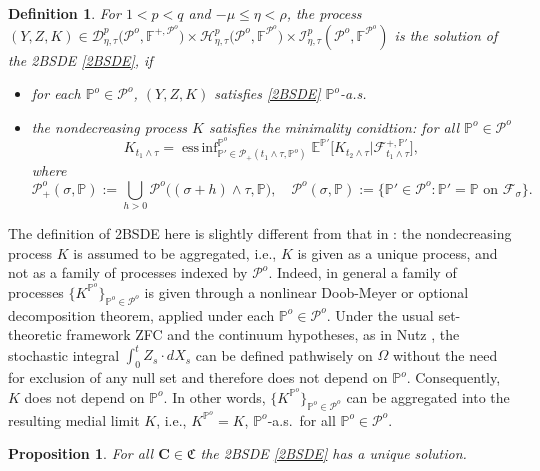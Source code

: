 \documentclass[11pt,a4paper]{article}
\numberwithin{equation}{section}
\def\dbF{\mathbb{F}}
\def\dbP{\mathbb{P}}
\newcommand{\cD}{\mathcal{D}}
\newcommand{\cF}{\mathcal{F}}
\newcommand{\cH}{\mathcal{H}}
\newcommand{\cI}{\mathcal{I}}
\newcommand{\cP}{\mathcal{P}}
\newcommand{\Cbf}{\mathbf{C}}
\newcommand{\frakC}{\mathfrak{C}}
\DeclareMathOperator*{\essinf}{ess\,inf}
\newtheorem{definition}[theorem]{Definition}
\newtheorem{proposition}[theorem]{Proposition}
\theoremstyle{definition}
\begin{document}
\begin{definition} \label{def:2BSDE}
  For $1<p<q$ and $-\mu\leq\eta<\rho$, the process $(Y,Z,K)\in\cD^p_{\eta,\tau}\big(\cP^o, \dbF^{+,\cP^o}\big)\times \cH^p_{\eta,\tau}\big(\cP^o,\dbF^{\cP^o}\big)\times \cI^p_{\eta,\tau}(\cP^o,\dbF^{\cP^o})$ is the solution of the 2BSDE \eqref{2BSDE}, 
   if 
   \begin{itemize}
    \item for each $\dbP^o\in\cP^o$, $(Y,Z,K)$ satisfies \eqref{2BSDE} $\dbP^o$-a.s.
    \item the nondecreasing process $K$ satisfies the minimality conidtion: for all $\dbP^o\in \cP^o$  
            \begin{equation*}
               K_{t_1\wedge \tau} = \essinf^{\dbP^o}_{\dbP'\in\cP_+(t_1\wedge\tau,\dbP^o)}\mathbb{E}^{\dbP'}\Big[K_{t_2\wedge\tau}\Big|\mathcal{F}^{+, \dbP'}_{t_1\wedge\tau}\Big], 
            \end{equation*}
            where 
             $$  \cP^o_+(\sigma, \dbP):=\bigcup_{h>0}\cP^o\big((\sigma+h)\wedge \tau, \dbP\big), \quad \cP^o(\sigma, \dbP):=\big\{\dbP'\in\cP^o: \dbP'=\dbP\mbox{ on }\cF_\sigma\big\}. $$ 
   \end{itemize}
\end{definition}
 
The definition of 2BSDE here is slightly different from that in \cite{LRTY18}: the nondecreasing process $K$ is assumed to be aggregated, i.e., $K$ is given as a unique process, and not as a family of processes indexed by $\cP^o$. 
Indeed, in general a family of processes $\big\{K^{\dbP^o}\big\}_{\dbP^o\in\cP^o}$ is given through a nonlinear Doob-Meyer or optional decomposition theorem, applied under each $\dbP^o\in\cP^o$. 
Under the usual set-theoretic framework ZFC and the continuum hypotheses, as in Nutz \cite{Nut12}, the stochastic integral $\int_0^tZ_s\cdot dX_s$ can be defined pathwisely on $\Omega$ without the need for exclusion of any null set
  and therefore does not depend on $\dbP^o$. 
Consequently, $K$ does not depend on $\dbP^o$. In other words, $\big\{K^{\dbP^o}\big\}_{\dbP^o\in\cP^o}$ can be aggregated into the resulting medial limit $K$, i.e., $K^{\dbP^o}=K$, $\dbP^o$-a.s.~for all $\dbP^o\in\cP^o$. 

\begin{proposition}
  For all $\Cbf\in\frakC$ the 2BSDE \eqref{2BSDE} has a unique solution. 
\end{proposition}
\end{document}
